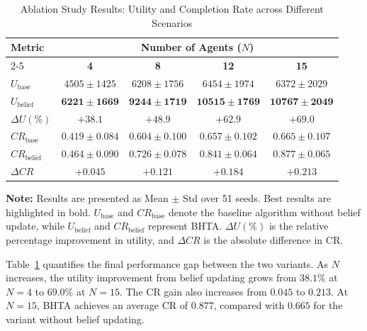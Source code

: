 \documentclass[journal,twoside,web]{ieeecolor}
\begin{document}
\begin{table}[htbp]
\centering
\caption{Ablation Study Results: Utility and Completion Rate across Different Scenarios}
\label{tab:ablation_results_compact}
\footnotesize
\setlength{\tabcolsep}{2.5pt} %
\renewcommand{\arraystretch}{1} %
\begin{tabular}{l c c c c}
\toprule
\multirow{2}{*}{\textbf{Metric}} & \multicolumn{4}{c}{\textbf{Number of Agents ($N$)}} \\
\cmidrule(lr){2-5}
 & \textbf{4} & \textbf{8} & \textbf{12} & \textbf{15} \\ %
\midrule
$U_{\text{base}}$   & $4505 \pm 1425$ & $6208 \pm 1756$ & $6454 \pm 1974$ & $6372 \pm 2029$ \\
$U_{\text{belief}}$ & $\mathbf{6221 \pm 1669}$ & $\mathbf{9244 \pm 1719}$ & $\mathbf{10515 \pm 1769}$ & $\mathbf{10767 \pm 2049}$ \\
$\Delta U(\%)$      & $+38.1$         & $+48.9$         & $+62.9$          & $+69.0$          \\
\midrule
$CR_{\text{base}}$   & $0.419 \pm 0.084$ & $0.604 \pm 0.100$ & $0.657 \pm 0.102$ & $0.665 \pm 0.107$ \\
$CR_{\text{belief}}$ & $\mathbf{0.464 \pm 0.090}$ & $\mathbf{0.726 \pm 0.078}$ & $\mathbf{0.841 \pm 0.064}$ & $\mathbf{0.877 \pm 0.065}$ \\
$\Delta CR$          & $+0.045$          & $+0.121$          & $+0.184$          & $+0.213$          \\
\bottomrule
\end{tabular}
\vspace{4pt}
\parbox{\columnwidth}{\footnotesize \textbf{Note:} Results are presented as Mean $\pm$ Std over 51 seeds. Best results are highlighted in bold. $U_{\text{base}}$ and $CR_{\text{base}}$ denote the baseline algorithm without belief update, while $U_{\text{belief}}$ and $CR_{\text{belief}}$ represent BHTA. $\Delta U(\%)$ is the relative percentage improvement in utility, and $\Delta CR$ is the absolute difference in CR.}
\end{table}

Table~\ref{tab:ablation_results_compact} quantifies the final performance gap between the two variants. As $N$ increases, the utility improvement from belief updating grows from $38.1\%$ at $N=4$ to $69.0\%$ at $N=15$. The CR gain also increases from $0.045$ to $0.213$. At $N=15$, BHTA achieves an average CR of $0.877$, compared with $0.665$ for the variant without belief updating.
\end{document}
